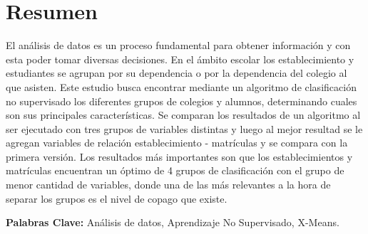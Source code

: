 \chapter*{Resumen}

El análisis de datos es un proceso fundamental para obtener información y con esta poder tomar diversas decisiones. En el ámbito escolar los establecimiento y estudiantes se agrupan por su dependencia o por la dependencia del colegio al que asisten. Este estudio busca encontrar mediante un algoritmo de clasificación no supervisado los diferentes grupos de colegios y alumnos, determinando cuales son sus principales características. Se comparan los resultados de un algoritmo al ser ejecutado con tres grupos de variables distintas y luego al mejor resultad se le agregan variables de relación establecimiento - matrículas y se compara con la primera versión. Los resultados más importantes son que los establecimientos y matrículas encuentran un óptimo de 4 grupos de clasificación con el grupo de menor cantidad de variables, donde una de las más relevantes a la hora de separar los grupos es el nivel de copago que existe. 

\textbf{Palabras Clave:} Análisis de datos, Aprendizaje No Supervisado, X-Means.